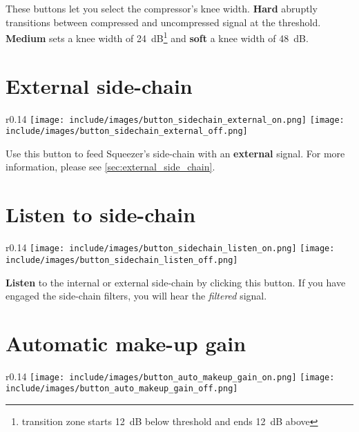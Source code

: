 These buttons let you select the compressor's knee width.
\textbf{Hard} abruptly transitions between compressed and uncompressed
signal at the threshold.  \textbf{Medium} sets a knee width of
\SI{24}{\dB}\footnote{transition zone starts \SI{12}{\dB} below
  threshold and ends \SI{12}{\dB} above} and \textbf{soft} a knee
width of \SI{48}{\dB}.

\section{External side-chain}

\begin{wrapfigure}{r}{0.14\linewidth}
  \texttt{[image: include/images/button\_sidechain\_external\_on.png]}
  \newline \vspace{-0.9\baselineskip}
  \texttt{[image: include/images/button\_sidechain\_external\_off.png]}
\end{wrapfigure}

Use this button to feed Squeezer's side-chain with an
\textbf{external} signal.  For more information, please see
\ref{sec:external_side_chain}.

\section{Listen to side-chain}

\begin{wrapfigure}{r}{0.14\linewidth}
  \texttt{[image: include/images/button\_sidechain\_listen\_on.png]}
  \newline \vspace{-0.9\baselineskip}
  \texttt{[image: include/images/button\_sidechain\_listen\_off.png]}
\end{wrapfigure}

\textbf{Listen} to the internal or external side-chain by clicking
this button.  If you have engaged the side-chain filters, you will
hear the \emph{filtered} signal.

\section{Automatic make-up gain}
\label{sec:buttons_automatic_makeup_gain}

\begin{wrapfigure}{r}{0.14\linewidth}
  \texttt{[image: include/images/button\_auto\_makeup\_gain\_on.png]}
  \newline \vspace{-0.9\baselineskip}
  \texttt{[image: include/images/button\_auto\_makeup\_gain\_off.png]}
\end{wrapfigure}

